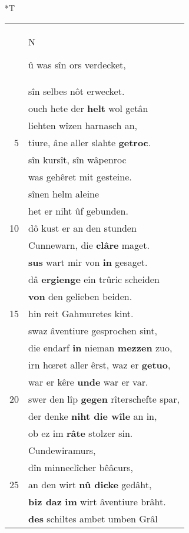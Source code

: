 \documentclass[8pt,a4paper,notitlepage]{article}
\begin{document}
\begin{table}[ht]
\begin{minipage}[t]{0.5\linewidth}
\end{minipage}
\hspace{0.5cm}
\begin{minipage}[t]{0.5\linewidth}
\small
\begin{center}*T
\end{center}
\begin{tabular}{rl}
 & \begin{large}N\end{large}û was sîn ors verdecket,\\ 
 & sîn selbes nôt erwecket.\\ 
 & ouch hete der \textbf{helt} wol getân\\ 
 & liehten wîzen harnasch an,\\ 
5 & tiure, âne aller slahte \textbf{getroc}.\\ 
 & sîn kursît, sîn wâpenroc\\ 
 & was gehêret mit gesteine.\\ 
 & sînen helm aleine\\ 
 & het er niht ûf gebunden.\\ 
10 & dô kust er an den stunden\\ 
 & Cunnewarn, die \textbf{clâre} maget.\\ 
 & \textbf{sus} wart mir von \textbf{in} gesaget.\\ 
 & dâ \textbf{ergienge} ein trûric scheiden\\ 
 & \textbf{von} den gelieben beiden.\\ 
15 & hin reit Gahmuretes kint.\\ 
 & swaz âventiure gesprochen sint,\\ 
 & die endarf \textbf{in} nieman \textbf{mezzen} zuo,\\ 
 & irn hœret aller êrst, waz er \textbf{getuo},\\ 
 & war er kêre \textbf{unde} war er var.\\ 
20 & swer den lîp \textbf{gegen} rîterschefte spar,\\ 
 & der denke \textbf{niht die wîle} an in,\\ 
 & ob ez im \textbf{râte} stolzer sin.\\ 
 & Cundewiramurs,\\ 
 & dîn minneclîcher bêâcurs,\\ 
25 & an den wirt \textbf{nû dicke} gedâht,\\ 
 & \textbf{biz daz} \textbf{im} wirt âventiure brâht.\\ 
 & \textbf{des} schiltes ambet umben Grâl\\ 

\end{tabular}
\end{minipage}
\end{table}
\end{document}
